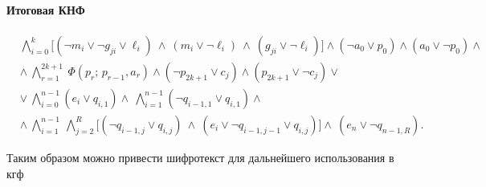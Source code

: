 \paragraph{Итоговая КНФ}



\[
\begin{aligned}
& \bigwedge_{i=0}^{k}
  \Big[(\neg m_i \lor \neg g_{ji} \lor \ell_i)\ \land\ (m_i \lor \neg \ell_i)\ \land\ (g_{ji} \lor \neg \ell_i)\Big]
  \land (\neg a_0 \lor p_0) \land (a_0 \lor \neg p_0) \land
\\
& \land\ \bigwedge_{r=1}^{2k+1}\ \Phi(p_r;\,p_{r-1},a_r)
  \land (\neg p_{2k+1} \lor c_j) \land (p_{2k+1} \lor \neg c_j)\lor
\\
& \lor\ \bigwedge_{i=0}^{n-1} (e_i \lor q_{i,1})
  \land\ \bigwedge_{i=1}^{n-1} (\neg q_{i-1,1} \lor q_{i,1})\land
\\
& \land\ \bigwedge_{i=1}^{n-1}\ \bigwedge_{j=2}^{R}
  \Big[(\neg q_{i-1,j} \lor q_{i,j}) \ \land\ (e_i \lor \neg q_{i-1,j-1} \lor q_{i,j})\Big]
  \land\ (e_n \lor \neg q_{n-1,R}) .
\end{aligned}
\]


Таким образом можно привести шифротекст для дальнейшего использования в кгф





